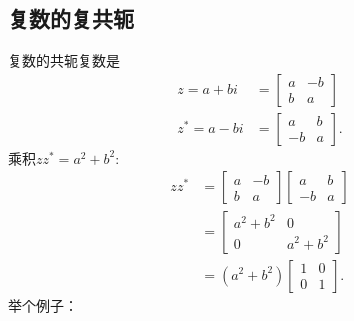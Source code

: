 \subsection{复数的复共轭}
复数的共轭复数是
$$
  \begin{aligned}
    z=a+b i     & =\left[\begin{array}{cc}
        a & -b \\
        b & a
      \end{array}\right]   \\
    z^{*}=a-b i & =\left[\begin{array}{cc}
        a  & b \\
        -b & a
      \end{array}\right] .
  \end{aligned}
$$
乘积$z z^{*}=a^{2}+b^{2}$:
$$
  \begin{aligned}
    z z^{*} & =\left[\begin{array}{cc}
        a & -b \\
        b & a
      \end{array}\right]\left[\begin{array}{cc}
        a  & b \\
        -b & a
      \end{array}\right] \\
            & =\left[\begin{array}{cc}
        a^{2}+b^{2} & 0           \\
        0           & a^{2}+b^{2}
      \end{array}\right]                                        \\
            & =\left(a^{2}+b^{2}\right)\left[\begin{array}{ll}
        1 & 0 \\
        0 & 1
      \end{array}\right] .
  \end{aligned}
$$
举个例子：

